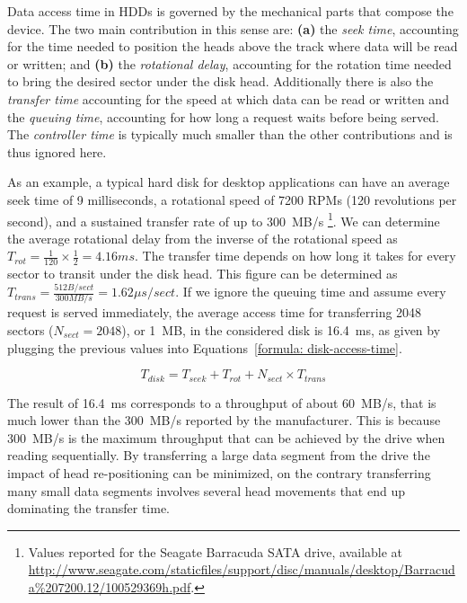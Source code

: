 Data access time in HDDs is governed by the mechanical parts that compose the device. The two main contribution in this sense are: \textbf{(a)} the \textit{seek time}, accounting for the time needed to position 
the heads above the track where data will be read or written; and \textbf{(b)} the \textit{rotational delay}, accounting for the rotation time needed to bring the desired sector under the disk head. Additionally 
there is also the \textit{transfer time} accounting for the speed at which data can be read or written and the \textit{queuing time}, accounting for how long a request waits before being served. The 
\textit{controller time} is typically much smaller than the other contributions and is thus ignored here.

As an example, a typical hard disk for desktop applications can have an average seek time of 9 milliseconds, a rotational speed of 7200 RPMs (120 revolutions per second), and a sustained transfer rate of up to 300~MB/s
\footnote{Values reported for the Seagate Barracuda SATA drive, available at \url{http://www.seagate.com/staticfiles/support/disc/manuals/desktop/Barracuda\%207200.12/100529369h.pdf}.}. We can determine the average 
rotational delay from the inverse of the rotational speed as $T_{rot} = \frac{1}{120}\times\frac{1}{2} = 4.16 ms$. The transfer time depends on how long it takes for every sector to transit under the disk head. This 
figure can be determined as $T_{trans} = \frac{512 B/sect}{300 MB/s} = 1.62 \mu s/sect$. If we ignore the queuing time and assume every request is served immediately, the average access time for transferring 2048 
sectors ($N_{sect} = 2048$), or 1~MB, in the considered disk is 16.4~ms, as given by plugging the previous values into Equations~\ref{formula: disk-access-time}.

\begin{equation}\label{formula: disk-access-time}
T_{disk} = T_{seek} + T_{rot} + N_{sect} \times T_{trans}
\end{equation}

The result of 16.4~ms corresponds to a throughput of about 60~MB/s, that is much lower than the 300~MB/s reported by the manufacturer. This is because 300~MB/s is the maximum throughput that can be achieved by the 
drive when reading sequentially. By transferring a large data segment from the drive the impact of head re-positioning can be minimized, on the contrary transferring many small data segments involves several head 
movements that end up dominating the transfer time.

